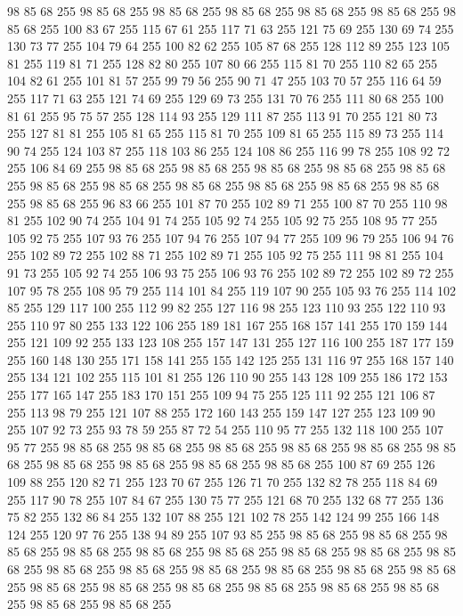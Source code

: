 98 85 68 255 98 85 68 255 98 85 68 255 98 85 68 255 98 85 68 255 98 85 68 255 98 85 68 255 100 83 67 255 115 67 61 255 117 71 63 255 121 75 69 255 130 69 74 255 130 73 77 255 104 79 64 255 100 82 62 255 105 87 68 255 128 112 89 255 123 105 81 255 119 81 71 255 128 82 80 255 107 80 66 255 115 81 70 255 110 82 65 255 104 82 61 255 101 81 57 255 99 79 56 255 90 71 47 255 103 70 57 255 116 64 59 255 117 71 63 255 121 74 69 255 129 69 73 255 131 70 76 255 111 80 68 255 100 81 61 255 95 75 57 255 128 114 93 255 129 111 87 255 113 91 70 255 121 80 73 255 127 81 81 255 105 81 65 255 115 81 70 255 109 81 65 255 115 89 73 255 114 90 74 255 124 103 87 255 118 103 86 255 124 108 86 255 116 99 78 255 108 92 72 255 106 84 69 255 98 85 68 255 98 85 68 255 98 85 68 255 98 85 68 255 98 85 68 255 98 85 68 255 98 85 68 255 98 85 68 255 98 85 68 255 98 85 68 255 98 85 68 255 98 85 68 255
96 83 66 255 101 87 70 255 102 89 71 255 100 87 70 255 110 98 81 255 102 90 74 255 104 91 74 255 105 92 74 255 105 92 75 255 108 95 77 255 105 92 75 255 107 93 76 255 107 94 76 255 107 94 77 255 109 96 79 255 106 94 76 255 102 89 72 255 102 88 71 255 102 89 71 255 105 92 75 255 111 98 81 255 104 91 73 255 105 92 74 255 106 93 75 255 106 93 76 255 102 89 72 255 102 89 72 255 107 95 78 255 108 95 79 255 114 101 84 255 119 107 90 255 105 93 76 255 114 102 85 255 129 117 100 255 112 99 82 255 127 116 98 255 123 110 93 255 122 110 93 255 110 97 80 255 133 122 106 255 189 181 167 255 168 157 141 255 170 159 144 255 121 109 92 255 133 123 108 255 157 147 131 255 127 116 100 255 187 177 159 255 160 148 130 255 171 158 141 255 155 142 125 255 131 116 97 255 168 157 140 255 134 121 102 255 115 101 81 255 126 110 90 255 143 128 109 255 186 172 153 255 177 165 147 255 183 170 151 255 109 94 75 255 125 111 92 255 121 106 87 255 113 98 79 255
121 107 88 255 172 160 143 255 159 147 127 255 123 109 90 255 107 92 73 255 93 78 59 255 87 72 54 255 110 95 77 255 132 118 100 255 107 95 77 255 98 85 68 255 98 85 68 255 98 85 68 255 98 85 68 255 98 85 68 255 98 85 68 255 98 85 68 255 98 85 68 255 98 85 68 255 98 85 68 255 100 87 69 255 126 109 88 255 120 82 71 255 123 70 67 255 126 71 70 255 132 82 78 255 118 84 69 255 117 90 78 255 107 84 67 255 130 75 77 255 121 68 70 255 132 68 77 255 136 75 82 255 132 86 84 255 132 107 88 255 121 102 78 255 142 124 99 255 166 148 124 255 120 97 76 255 138 94 89 255 107 93 85 255 98 85 68 255 98 85 68 255 98 85 68 255 98 85 68 255 98 85 68 255 98 85 68 255 98 85 68 255 98 85 68 255 98 85 68 255 98 85 68 255 98 85 68 255 98 85 68 255 98 85 68 255 98 85 68 255 98 85 68 255 98 85 68 255 98 85 68 255 98 85 68 255 98 85 68 255 98 85 68 255 98 85 68 255 98 85 68 255 98 85 68 255
